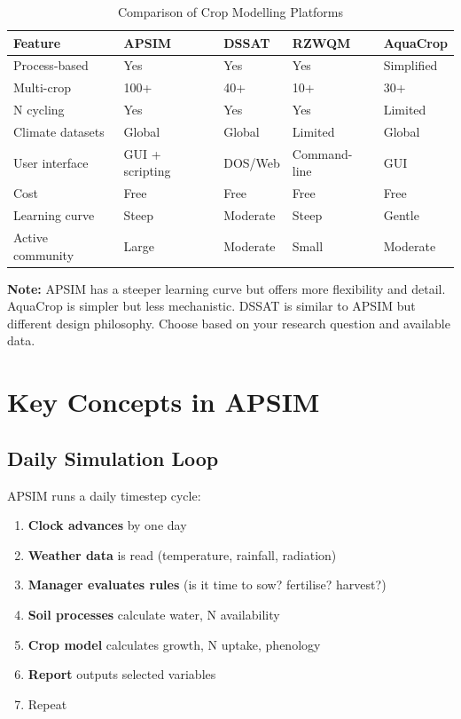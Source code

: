 \begin{table}[H]
\centering
\caption{Comparison of Crop Modelling Platforms}
\label{tab:model-comparison}
\begin{tabularx}{\textwidth}{l|X|X|X|X}
\toprule
\textbf{Feature} & \textbf{APSIM} & \textbf{DSSAT} & \textbf{RZWQM} & \textbf{AquaCrop} \\
\midrule
Process-based & Yes & Yes & Yes & Simplified \\
Multi-crop & 100+ & 40+ & 10+ & 30+ \\
N cycling & Yes & Yes & Yes & Limited \\
Climate datasets & Global & Global & Limited & Global \\
User interface & GUI + scripting & DOS/Web & Command-line & GUI \\
Cost & Free & Free & Free & Free \\
Learning curve & Steep & Moderate & Steep & Gentle \\
Active community & Large & Moderate & Small & Moderate \\
\bottomrule
\end{tabularx}
\end{table}

\begin{warningbox}
\textbf{Note:} APSIM has a steeper learning curve but offers more flexibility and detail. AquaCrop is simpler but less mechanistic. DSSAT is similar to APSIM but different design philosophy. Choose based on your research question and available data.
\end{warningbox}

\section{Key Concepts in APSIM}

\subsection{Daily Simulation Loop}

APSIM runs a daily timestep cycle:

\begin{enumerate}
  \item \textbf{Clock advances} by one day
  \item \textbf{Weather data} is read (temperature, rainfall, radiation)
  \item \textbf{Manager evaluates rules} (is it time to sow? fertilise? harvest?)
  \item \textbf{Soil processes} calculate water, N availability
  \item \textbf{Crop model} calculates growth, N uptake, phenology
  \item \textbf{Report} outputs selected variables
  \item Repeat
\end{enumerate}

